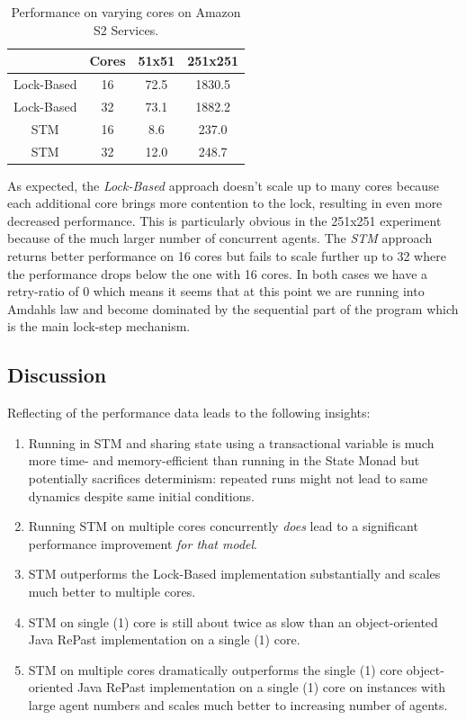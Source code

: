 \begin{table}
	\centering
  	\begin{tabular}{ c || c | c | c }
                   & Cores & 51x51   & 251x251 \\ \hline \hline 
    	Lock-Based & 16    & 72.5    & 1830.5  \\ \hline
    	Lock-Based & 32    & 73.1    & 1882.2  \\ \hline \hline 
   		
   		STM        & 16    & 8.6     & 237.0   \\ \hline
   		STM        & 32    & 12.0    & 248.7   \\ \hline \hline
   	\end{tabular}
  	
  	\caption{Performance on varying cores on Amazon S2 Services.}
	\label{tab:sir_varying_cores_amazon}
\end{table}

As expected, the \textit{Lock-Based} approach doesn't scale up to many cores because each additional core brings more contention to the lock, resulting in even more decreased performance. This is particularly obvious in the 251x251 experiment because of the much larger number of concurrent agents. The \textit{STM} approach returns better performance on 16 cores but fails to scale further up to 32 where the performance drops below the one with 16 cores. In both cases we have a retry-ratio of 0 which means it seems that at this point we are running into Amdahls law and become dominated by the sequential part of the program which is the main lock-step mechanism. 
%
%

\subsection{Discussion}
Reflecting of the performance data leads to the following insights:
\begin{enumerate}
	\item Running in STM and sharing state using a transactional variable is much more time- and memory-efficient than running in the State Monad but potentially sacrifices determinism: repeated runs might not lead to same dynamics despite same initial conditions.
	\item Running STM on multiple cores concurrently \textit{does} lead to a significant performance improvement \textit{for that model}.
	\item STM outperforms the Lock-Based implementation substantially and scales much better to multiple cores.
	\item STM on single (1) core is still about twice as slow than an object-oriented Java RePast implementation on a single (1) core.
	\item STM on multiple cores dramatically outperforms the single (1) core object-oriented Java RePast implementation on a single (1) core on instances with large agent numbers and scales much better to increasing number of agents.
\end{enumerate}
